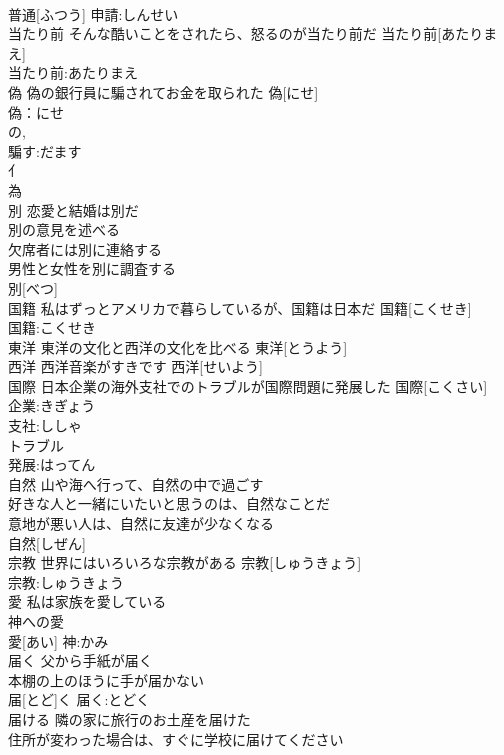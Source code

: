 \documentclass[8pt]{extreport}
\begin{document}
\begin{CJK}{UTF8}{min}
\\	普通[ふつう]			申請:しんせい
\\	当たり前	そんな酷いことをされたら、怒るのが当たり前だ	当たり前[あたりまえ]	
\\	当たり前:あたりまえ
\\	偽	偽の銀行員に騙されてお金を取られた	偽[にせ]	
\\	偽：にせ
\\	の, 
\\	騙す:だます
\\	亻 
\\	為 
\\	別	恋愛と結婚は別だ 
\\	別の意見を述べる 
\\	欠席者には別に連絡する 
\\	男性と女性を別に調査する 
\\	別[べつ]						
\\	国籍	私はずっとアメリカで暮らしているが、国籍は日本だ	国籍[こくせき]	
\\	国籍:こくせき
\\	東洋	東洋の文化と西洋の文化を比べる	東洋[とうよう]	
\\	西洋	西洋音楽がすきです	西洋[せいよう]	
\\	国際	日本企業の海外支社でのトラブルが国際問題に発展した	国際[こくさい]	
\\	企業:きぎょう
\\	支社:ししゃ
\\	トラブル
\\	発展:はってん
\\	自然	山や海へ行って、自然の中で過ごす 
\\	好きな人と一緒にいたいと思うのは、自然なことだ 
\\	意地が悪い人は、自然に友達が少なくなる 
\\	自然[しぜん]						
\\	宗教	世界にはいろいろな宗教がある	宗教[しゅうきょう]	
\\	宗教:しゅうきょう
\\	愛	私は家族を愛している 
\\	神への愛 
\\	愛[あい]			神:かみ
\\	届く	父から手紙が届く 
\\	本棚の上のほうに手が届かない 
\\	届[とど]く			届く:とどく
\\	届ける	隣の家に旅行のお土産を届けた 
\\	住所が変わった場合は、すぐに学校に届けてください 

\end{CJK}
\end{document}
